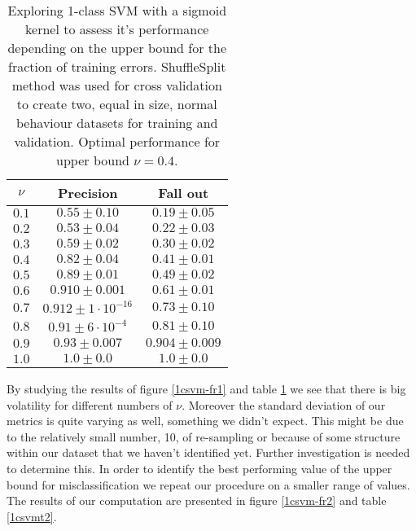 \documentclass[reqno,openany,12pt]{amsbook}
\begin{document}
\begin{table}
\begin{tabular}{|c|c|c|}
\hline
$\nu$ &  Precision & Fall out \\ \hline 
$0.1$ &  $0.55 \pm 0.10$ & $0.19 \pm 0.05$ \\ \hline 
$0.2$ &  $0.53 \pm 0.04$ & $0.22 \pm 0.03$ \\ \hline 
$0.3$ &  $0.59 \pm 0.02$ & $0.30 \pm 0.02$ \\ \hline 
$0.4$ &  $0.82 \pm 0.04$ & $0.41 \pm 0.01$ \\ \hline 
$0.5$ &  $0.89 \pm 0.01$ & $0.49 \pm 0.02$ \\ \hline 
$0.6$ &  $0.910 \pm 0.001$ & $0.61 \pm 0.01$ \\ \hline 
$0.7$ &  $0.912 \pm 1\cdot 10^{-16}$ & $0.73 \pm 0.10$ \\ \hline 
$0.8$ &  $0.91 \pm 6\cdot 10^{-4}$ & $0.81 \pm 0.10$ \\ \hline 
$0.9$ &  $0.93 \pm 0.007$ & $0.904 \pm 0.009$ \\ \hline
$1.0$ &  $1.0 \pm 0.0$ & $1.0 \pm 0.0$ \\ \hline
\end{tabular}
\vspace{5pt}
\caption[1-class SVM performance depending on bound for training errors]{Exploring 1-class SVM with a sigmoid kernel to assess it's performance depending on the upper bound for the fraction of training errors. ShuffleSplit method was used for cross validation to create two, equal in size, normal behaviour datasets for training and validation. Optimal performance for upper bound $\nu = 0.4$.}
\label{1csvmt1}
\end{table}

By studying the results of figure \ref{1csvm-fr1} and table \ref{1csvmt1} we see that there is  big volatility for different numbers of $\nu$. Moreover the standard deviation of our metrics is quite varying as well, something we didn't expect. This might be due to the relatively small number, 10, of re-sampling
or because of some structure within our dataset that we haven't identified yet. Further investigation is needed to determine this. In order to identify the best performing value of the upper bound for misclassification we repeat our procedure on a smaller range of values. The results of our computation are presented in figure \ref{1csvm-fr2} and table \ref{1csvmt2}.
\end{document}
